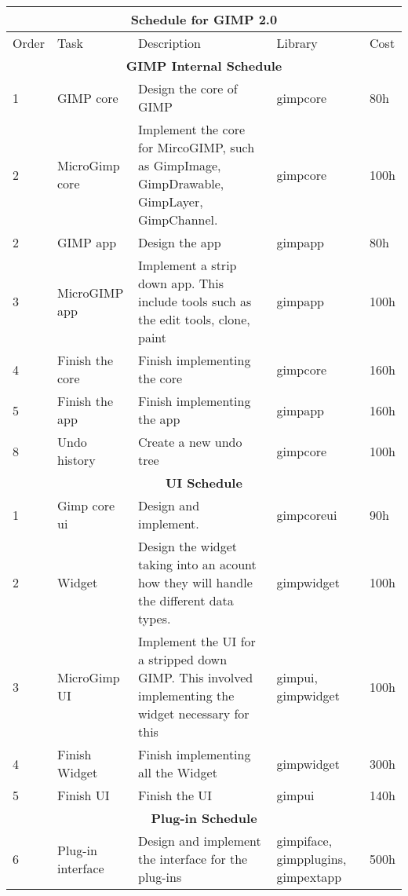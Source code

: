 \begin{flushleft}		
\begin{tabular}{|l|p{3cm}|p{5cm}|p{2cm}|l|}\hline
\multicolumn{5}{|c|}{\rule[-3mm]{0mm}{8mm} \large \bf Schedule for GIMP 2.0}\\  
\hline
Order & Task & Description & Library & Cost\\ 
\hline 

\multicolumn{5}{|c|}{\bf GIMP Internal Schedule}\\
\hline 
1 & GIMP core & Design the core of GIMP & gimpcore & 80h\\
\hline 
2 & MicroGimp core & Implement the core for MircoGIMP, such as GimpImage, GimpDrawable, GimpLayer, GimpChannel. & gimpcore & 100h\\
\hline
2 & GIMP app & Design the app & gimpapp & 80h\\
\hline 
3 & MicroGIMP app & Implement a strip down app. This include tools such as the edit tools, clone, paint & gimpapp & 100h\\
\hline 
4 & Finish the core & Finish implementing the core & gimpcore & 160h\\
\hline
5 & Finish the app & Finish implementing the app & gimpapp & 160h\\
\hline 
8 & Undo history & Create a new undo tree & gimpcore & 100h\\
\hline

\multicolumn{5}{|c|}{\bf UI Schedule}\\
\hline 
1 & Gimp core ui & Design and implement. & gimpcoreui & 90h\\
\hline
2 & Widget & Design the widget taking into an acount how they will handle the different data types. & gimpwidget &100h\\
\hline
3 & MicroGimp UI & Implement the UI for a stripped down GIMP. This involved implementing the widget necessary for this& gimpui, gimpwidget & 100h\\
\hline
4 & Finish Widget & Finish implementing all the Widget & gimpwidget & 300h\\
\hline
5 & Finish UI & Finish the UI & gimpui & 140h\\
\hline 

\multicolumn{5}{|c|}{\bf Plug-in Schedule}\\
\hline
6 & Plug-in interface & Design and implement the interface for the plug-ins & gimpiface, gimpplugins, gimpextapp & 500h\\ 
\hline


\end{tabular}
\end{flushleft}
